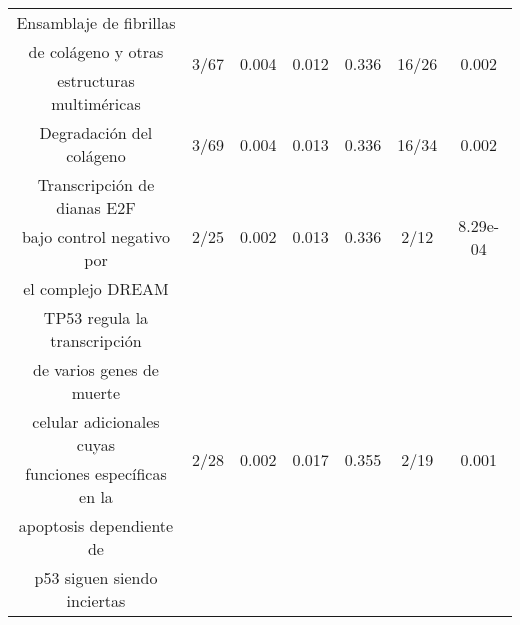 \begin{table}[!htb]
\begin{tabular}{|c|c|c|c|c|c|c|}
		Ensamblaje de fibrillas & \multirow{3}{*}{3/67} & \multirow{3}{*}{0.004} & \multirow{3}{*}{0.012} & \multirow{3}{*}{0.336} & \multirow{3}{*}{16/26} & \multirow{3}{*}{0.002} \\
		de colágeno y otras & & & & & & \\
		estructuras multiméricas & & & & & & \\\hline
		
		Degradación del colágeno & 3/69 & 0.004 & 0.013 & 0.336 & 16/34 & 0.002 \\\hline
		
		Transcripción de dianas E2F & \multirow{3}{*}{2/25} & \multirow{3}{*}{0.002} & \multirow{3}{*}{0.013} & \multirow{3}{*}{0.336} & \multirow{3}{*}{2/12} & \multirow{3}{*}{8.29e-04} \\
		bajo control negativo por & & & & & & \\
		el complejo DREAM & & & & & & \\\hline
		
		TP53 regula la transcripción & \multirow{6}{*}{2/28} & \multirow{6}{*}{0.002} & \multirow{6}{*}{0.017} & \multirow{6}{*}{0.355} & \multirow{6}{*}{2/19} & \multirow{6}{*}{0.001} \\
		de varios genes de muerte & & & & & & \\
		celular adicionales cuyas & & & & & & \\
		funciones específicas en la & & & & & & \\
		apoptosis dependiente de & & & & & & \\
		p53 siguen siendo inciertas & & & & & & \\\hline
		
	\end{tabular}
\end{table}


